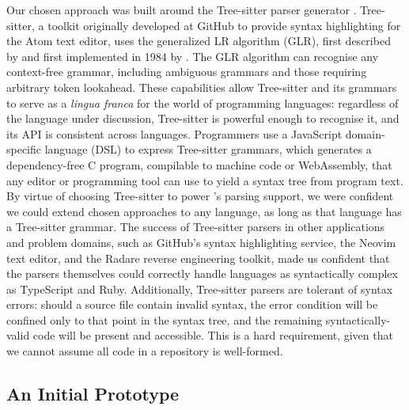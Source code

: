 \documentclass[acmsmall,fleqn,12pt]{acmart}
\begin{document}
Our chosen approach was built around the Tree-sitter parser generator
\cite{Brunsfeld18Tree}. Tree-sitter, a toolkit originally developed at GitHub to
provide syntax highlighting for the Atom text editor, uses the generalized LR
algorithm (GLR), first described by \citet{Lang74Deterministic} and first
implemented in 1984 by \citet{Tomita84Efficient}. The GLR algorithm can
recognise any context-free grammar, including ambiguous grammars and those
requiring arbitrary token lookahead. These capabilities allow Tree-sitter and
its grammars to serve as a \emph{lingua franca} for the world of programming
languages: regardless of the language under discussion, Tree-sitter is powerful
enough to recognise it, and its API is consistent across languages. Programmers
use a JavaScript domain-specific language (DSL) to express Tree-sitter grammars,
which generates a dependency-free C program, compilable to machine code or
WebAssembly, that any editor or programming tool can use to yield a syntax tree
from program text. By virtue of choosing Tree-sitter to power \semantic{}’s
parsing support, we were confident we could extend chosen approaches to any
language, as long as that language has a Tree-sitter grammar. The success of
Tree-sitter parsers in other applications and problem domains, such as GitHub's
syntax highlighting service, the Neovim text editor, and the Radare reverse
engineering toolkit, made us confident that the parsers themselves could
correctly handle languages as syntactically complex as TypeScript and Ruby.
Additionally, Tree-sitter parsers are tolerant of syntax errors: should a source
file contain invalid syntax, the error condition will be confined only to that
point in the syntax tree, and the remaining syntactically-valid code will be
present and accessible. This is a hard requirement, given that we cannot
assume all code in a repository is well-formed.

\subsection{An Initial Prototype}
\end{document}
